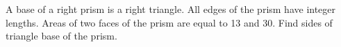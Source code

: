 \problem
A base of a right prism is a right triangle.
All edges of the prism have integer lengths.
Areas of two faces of the prism are equal to 13 and 30.
Find sides of triangle base of the prism.
\solution
\endproblem

